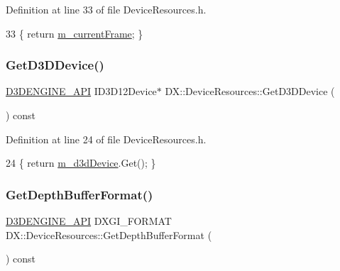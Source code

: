 Definition at line 33 of file Device\+Resources.\+h.


\begin{DoxyCode}
33 \{ \textcolor{keywordflow}{return} \mbox{\hyperlink{class_d_x_1_1_device_resources_ac5373e60722eaa25c1068aa754b501fa}{m\_currentFrame}}; \}
\end{DoxyCode}
\mbox{\label{class_d_x_1_1_device_resources_ab453c5634e7cd987bee4a1819b78122a}} 
\subsubsection{\texorpdfstring{Get\+D3\+D\+Device()}{GetD3DDevice()}}
{\footnotesize\ttfamily \mbox{\hyperlink{stdafx_8h_a8ee2d990c5dfba7794dd2b60741d7722}{D3\+D\+E\+N\+G\+I\+N\+E\+\_\+\+A\+PI}} I\+D3\+D12\+Device$\ast$ D\+X\+::\+Device\+Resources\+::\+Get\+D3\+D\+Device (\begin{DoxyParamCaption}{ }\end{DoxyParamCaption}) const\hspace{0.3cm}{\ttfamily [inline]}}



Definition at line 24 of file Device\+Resources.\+h.


\begin{DoxyCode}
24 \{ \textcolor{keywordflow}{return} \mbox{\hyperlink{class_d_x_1_1_device_resources_ac883ca593d5c03fe20d5865cb033cee1}{m\_d3dDevice}}.Get(); \}
\end{DoxyCode}
\mbox{\label{class_d_x_1_1_device_resources_a75ba016c43eba423ed0a6d9a3a60edf1}} 
\subsubsection{\texorpdfstring{Get\+Depth\+Buffer\+Format()}{GetDepthBufferFormat()}}
{\footnotesize\ttfamily \mbox{\hyperlink{stdafx_8h_a8ee2d990c5dfba7794dd2b60741d7722}{D3\+D\+E\+N\+G\+I\+N\+E\+\_\+\+A\+PI}} D\+X\+G\+I\+\_\+\+F\+O\+R\+M\+AT D\+X\+::\+Device\+Resources\+::\+Get\+Depth\+Buffer\+Format (\begin{DoxyParamCaption}{ }\end{DoxyParamCaption}) const\hspace{0.3cm}{\ttfamily [inline]}}



